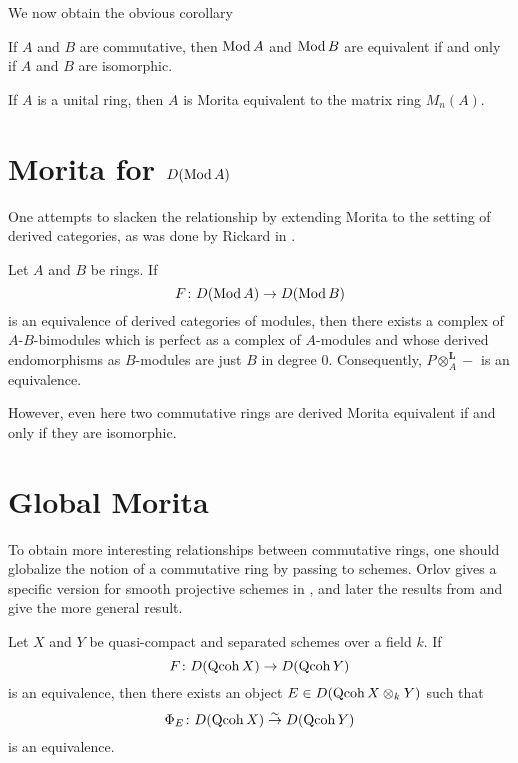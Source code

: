 \documentclass[reqno, 12pt]{amsart}
\begin{document}
We now obtain the obvious corollary
\begin{corollary}
  If $A$ and $B$ are commutative, then $\operatorname{Mod}A$ and $\operatorname{Mod}B$ are equivalent if and only if $A$ and $B$ are isomorphic.
\end{corollary}

\begin{corollary}\label{cor: morita example}
  If $A$ is a unital ring, then $A$ is Morita equivalent to the matrix ring $M_n(A)$.
\end{corollary}

\section{Morita for $D(\operatorname{Mod}A)$}

One attempts to slacken the relationship by extending Morita to the setting of derived categories, as was done by Rickard in \cite{JR89}.
\begin{theorem}
  Let $A$ and $B$ be rings.  If
  $$F \colon D(\operatorname{Mod}A) \to D(\operatorname{Mod}B)$$
  is an equivalence of derived categories of modules, then there exists a complex of $A$-$B$-bimodules which is perfect as a complex of $A$-modules and whose derived endomorphisms as $B$-modules are just $B$ in degree 0.
  Consequently, $P \otimes^\mathbf{L}_A -$ is an equivalence.
\end{theorem}

However, even here two commutative rings are derived Morita equivalent if and only if they are isomorphic.

\section{Global Morita}
To obtain more interesting relationships between commutative rings, one should globalize the notion of a commutative ring by passing to schemes.
Orlov gives a specific version for smooth projective schemes in \cite{Orlov}, and later the results from \cite{Toen} and \cite{Lunts Orlov} give the more general result.

\begin{theorem}
  Let $X$ and $Y$ be quasi-compact and separated schemes over a field $k$.
  If
  $$F \colon D(\operatorname{Qcoh}X) \to D(\operatorname{Qcoh}Y)$$
  is an equivalence, then there exists an object $E \in D(\operatorname{Qcoh}X \otimes_k Y)$ such that
  $$\Phi_E \colon D(\operatorname{Qcoh}X) \overset{\sim}\to D(\operatorname{Qcoh}Y)$$
  is an equivalence.
\end{theorem}
\end{document}
